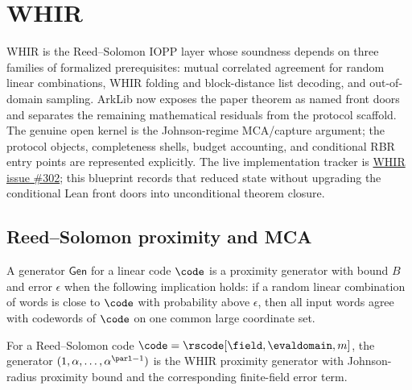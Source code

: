
\section{WHIR}\label{sec:whir}

WHIR is the Reed--Solomon IOPP layer whose soundness depends on three families of
formalized prerequisites: mutual correlated agreement for random linear combinations, WHIR
folding and block-distance list decoding, and out-of-domain sampling.  ArkLib now exposes the
paper theorem as named front doors and separates the remaining mathematical residuals from the
protocol scaffold.  The genuine open kernel is the Johnson-regime MCA/capture argument; the
protocol objects, completeness shells, budget accounting, and conditional RBR entry points are
represented explicitly.  The live implementation tracker is
\href{https://github.com/lalalune/ArkLib/issues/302}{WHIR issue \#302}; this blueprint records
that reduced state without upgrading the conditional Lean front doors into unconditional theorem
closure.

\subsection{Reed--Solomon proximity and MCA}\label{sec:whir_mca}

\begin{definition}\label{def:whir_proximity_generator}
    A generator $\mathsf{Gen}$ for a linear code $\code$ is a proximity generator with
    bound $B$ and error $\epsilon$ when the following implication holds: if a random linear
    combination of words is close to $\code$ with probability above $\epsilon$, then all input
    words agree with codewords of $\code$ on one common large coordinate set.
\end{definition}

\begin{theorem}\label{thm:whir_proximity_gap}
    For a Reed--Solomon code $\code=\rscode[\field,\evaldomain,m]$, the generator
    $(1,\alpha,\ldots,\alpha^{\parl-1})$ is the WHIR proximity generator with Johnson-radius
    proximity bound and the corresponding finite-field error term.
\end{theorem}

